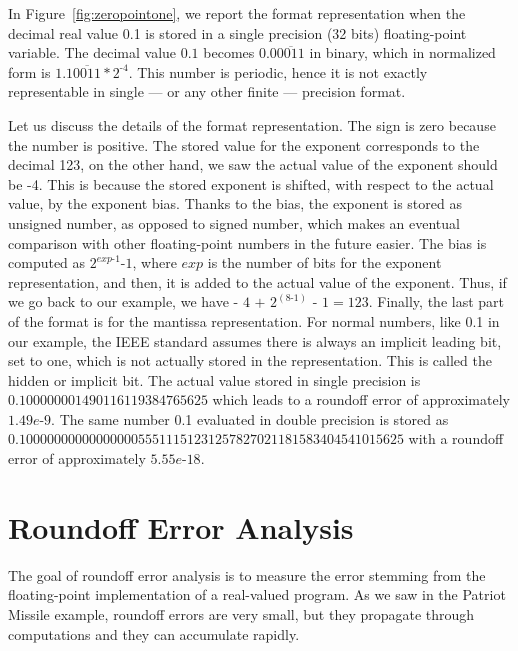 In Figure~\ref{fig:zeropointone}, we report the format representation when the decimal real value 0.1 is stored in a single precision (32 bits) floating-point variable.
%
The decimal value $0.1$ becomes $0.0\overline{0011}$ in binary, which in normalized form is $1.1\overline{0011}*2^{\text{-}4}$.
%
This number is periodic, hence it is not exactly representable in single --- or any other finite --- precision format.
%

Let us discuss the details of the format representation.
%
The sign is zero because the number is positive.
%
The stored value for the exponent corresponds to the decimal 123, on the other hand, we saw the actual value of the exponent should be -4.
%
This is because the stored exponent is shifted, with respect to the actual value, by the exponent bias. 
%
Thanks to the bias, the exponent is stored as unsigned number, as opposed to signed number, which makes an eventual comparison with other floating-point numbers in the future easier.
%
The bias is computed as $2^{exp\text{-}1}\text{-}1$, where $exp$ is the number of bits for the exponent representation, and then, it is added to the actual value of the exponent.
%
Thus, if we go back to our example, we have $\text{- }4\text{ + }2^{(8\text{-}1)}\text{ - }1=123$.
%
Finally, the last part of the format is for the mantissa representation. 
%
For normal numbers, like 0.1 in our example, the IEEE standard assumes there is always an implicit leading bit, set to one, which is not actually stored in the representation.
%
%
This is called the hidden or implicit bit.
%
The actual value stored in single precision is $0.100000001490116119384765625$ which leads to a roundoff error of approximately $1.49e\text{-}9$.
%
The same number 0.1 evaluated in double precision is stored as \\ $0.1000000000000000055511151231257827021181583404541015625$ with a roundoff error of approximately $5.55e\text{-}18$.
%
\section{Roundoff Error Analysis}
%
The goal of roundoff error analysis is to measure the error stemming from the floating-point implementation of a real-valued program.
%
As we saw in the Patriot Missile example, roundoff errors are very small, but they propagate through computations and they can accumulate rapidly.
%
%
%

